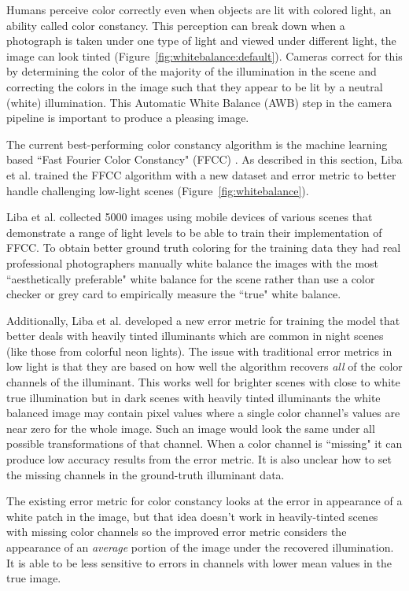 \documentclass{sig-alternate}
\begin{document}
Humans perceive color correctly even when objects are lit with colored light, an ability called color constancy. This perception can break down when a photograph is taken under one type of light and viewed under different light, the image can look tinted (Figure~\ref{fig:whitebalance:default}).
Cameras correct for this by determining the color of the majority of the illumination in the scene and correcting the colors in the image such that they appear to be lit by a neutral (white) illumination. 
This Automatic White Balance (AWB) step in the camera pipeline is important to produce a pleasing image. \cite{blog:Levoy2018}

The current best-performing color constancy algorithm is the machine learning based ``Fast Fourier Color Constancy" (FFCC) \cite{Barron2017}.
As described in this section, Liba et al. trained the FFCC algorithm with a new dataset and error metric to better handle challenging low-light scenes (Figure~\ref{fig:whitebalance}).

Liba et al. collected 5000 images using mobile devices of various scenes that demonstrate a range of light levels to be able to train their implementation of FFCC. To obtain better ground truth coloring for the training data they had real professional photographers manually white balance the images with the most ``aesthetically preferable" white balance for the scene rather than use a color checker or grey card to empirically measure the ``true" white balance.

Additionally, Liba et al. developed a new error metric for training the model that better deals with heavily tinted illuminants which are common in night scenes (like those from colorful neon lights). The issue with traditional error metrics in low light is that they are based on how well the algorithm recovers \emph{all} of the color channels of the illuminant. This works well for brighter scenes with close to white true illumination but in dark scenes with heavily tinted illuminants the white balanced image may contain pixel values where a single color channel's values are near zero for the whole image. Such an image would look the same under all possible transformations of that channel. 
When a color channel is ``missing" it can produce low accuracy results from the error metric. It is also unclear how to set the missing channels in the ground-truth illuminant data.

The existing error metric for color constancy looks at the error in appearance of a white patch in the image, but that idea doesn't work in heavily-tinted scenes with missing color channels so the improved error metric considers the appearance of an \emph{average} portion of the image under the recovered illumination. It is able to be less sensitive to errors in channels with lower mean values in the true image.
\end{document}
